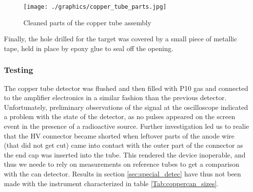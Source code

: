\begin{figure}[h]
  \centering
  \texttt{[image: ./graphics/copper\_tube\_parts.jpg]}
  \caption{Cleaned parts of the copper tube assembly}
  \label{fig:copper_parts}
\end{figure}

Finally, the hole drilled for the target was covered by a small piece of metallic tape, held in place by epoxy glue to seal off the opening.

\subsubsection{Testing}

The copper tube detector was flushed and then filled with P10 gas and connected to the amplifier electronics in a similar fashion than the previous detector. Unfortunately, preliminary observations of the signal at the oscilloscope indicated a problem with the state of the detector, as no pulses appeared on the screen event in the presence of a radioactive source. Further investigation led us to realie that the HV connector became shorted when leftover parts of the anode wire (that did not get cut) came into contact with the outer part of the connector as the end cap was inserted into the tube. This rendered the device inoperable, and thus we neede to rely on measurements on reference tubes to get a comparison with the can detector. Results in section \ref{sec:special_detec} have thus not been made with the instrument characterized in table \ref{Tab:coppercan_sizes}.

